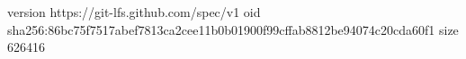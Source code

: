 version https://git-lfs.github.com/spec/v1
oid sha256:86bc75f7517abef7813ca2cee11b0b01900f99cffab8812be94074c20cda60f1
size 626416

